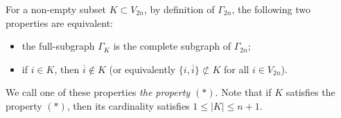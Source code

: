 \documentclass[12pt]{amsart}
\theoremstyle{remark}
\numberwithin{equation}{section}
\begin{document}
For a non-empty subset $K\subset V_{2n}$, by definition of $\Gamma_{2n}$,
the following two properties are equivalent:
\begin{itemize}
\item the full-subgraph $\Gamma_{K}$ is  the complete subgraph of $\Gamma_{2n}$;
\item if $i\in K$, then $\overline{i}\not\in K$ (or equivalently $\{i, \overline{i}\}\not\subset K$ for all $i\in V_{2n}$).
\end{itemize}
We call one of these properties {\it the property $(\ast)$}.
Note that if $K$ satisfies the property $(*)$, then its cardinality satisfies $1\le |K|\le n+1$.
\end{document}
